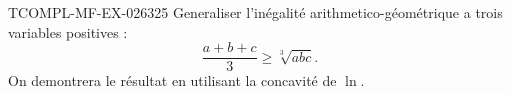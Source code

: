 \begin{exercice}{TCOMPL-MF-EX-026}{3}{25}
Generaliser l'inégalité arithmetico-géométrique a trois variables positives :
\[ \frac{a+b+c}{3} \geq \sqrt[3]{abc}. \]
On demontrera le résultat en utilisant la concavité de $\ln$.

\end{exercice}
